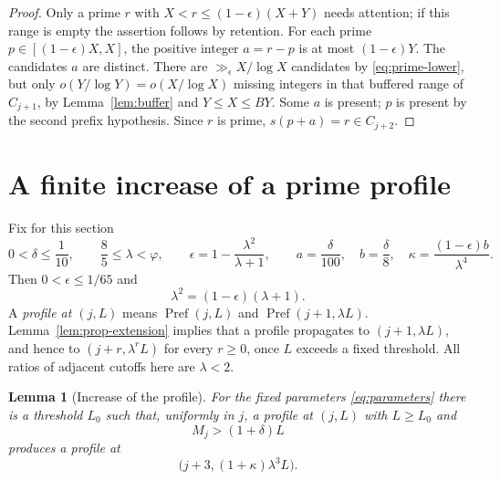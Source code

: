 \documentclass[11pt,letterpaper]{article}
\numberwithin{equation}{section}
\newtheorem{lemma}[theorem]{Lemma}
\theoremstyle{remark}
\newcommand{\ph}{\varphi}
\begin{document}
\begin{proof}
Only a prime $r$ with $X<r\le(1-\epsilon)(X+Y)$ needs attention;
if this range is empty the assertion follows by retention. For each prime
$p\in[(1-\epsilon)X,X]$, the positive integer $a=r-p$ is at most
$(1-\epsilon)Y$. The candidates $a$ are distinct. There are
$\gg_\epsilon X/\log X$ candidates by \eqref{eq:prime-lower}, but
only $o(Y/\log Y)=o(X/\log X)$ missing integers in that buffered range
of $C_{j+1}$, by Lemma~\ref{lem:buffer} and $Y\le X\le BY$.
Some $a$ is present; $p$ is present by the second prefix hypothesis.
Since $r$ is prime, $s(p+a)=r\in C_{j+2}$.
\end{proof}

\section{A finite increase of a prime profile}\label{sec:boost}

Fix for this section
\begin{equation}\label{eq:parameters}
 0<\delta\le\frac1{10},\qquad \frac85\le\lambda<\ph,\qquad
 \epsilon=1-\frac{\lambda^2}{\lambda+1},\qquad
 a=\frac{\delta}{100},\quad b=\frac{\delta}{8},\quad
 \kappa=\frac{(1-\epsilon)b}{\lambda^4}.
\end{equation}
Then $0<\epsilon\le1/65$ and
\begin{equation}\label{eq:lambda-recursion}
 \lambda^2=(1-\epsilon)(\lambda+1).
\end{equation}
A \emph{profile at $(j,L)$} means
$\operatorname{Pref}(j,L)$ and $\operatorname{Pref}(j+1,\lambda L)$.
Lemma~\ref{lem:prop-extension} implies that a profile propagates to
$(j+1,\lambda L)$, and hence to $(j+r,\lambda^rL)$ for every $r\ge0$,
once $L$ exceeds a fixed threshold. All ratios of adjacent cutoffs here
are $\lambda<2$.

\begin{lemma}[Increase of the profile]\label{lem:boost}
For the fixed parameters \eqref{eq:parameters} there is a threshold $L_0$
such that, uniformly in $j$, a profile at $(j,L)$ with $L\ge L_0$ and
\begin{equation}\label{eq:outlier-condition}
 M_j>(1+\delta)L
\end{equation}
produces a profile at
\begin{equation}\label{eq:boosted-pair}
 \bigl(j+3,(1+\kappa)\lambda^3L\bigr).
\end{equation}
\end{lemma}
\end{document}
